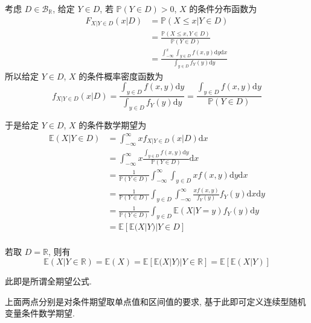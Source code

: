 \documentclass[openany]{ctexbook}
\theoremstyle{kaiti}
\theoremstyle{normal}
\begin{document}
考虑 $D\in\mathcal{B}_{\mathbb{R}}$, 给定 $Y\in D$, 若 $\mathbb{P}(Y\in D)>0$, $X$ 的条件分布函数为
\begin{equation}
  \begin{aligned}
    F_{X|Y\in D}(x|D)
    &=\mathbb{P}(X\leqslant x|Y\in D)\\
    &=\frac{\mathbb{P}(X\leqslant x,Y\in D)}{\mathbb{P}(Y\in D)}\\
    &=\frac{\displaystyle\int_{-\infty}^x\int_{y\in D}f(x,y)\mathrm{d}y\mathrm{d}x}{\displaystyle\int_{y\in D}f_Y(y)\mathrm{d}y}
  \end{aligned}
\end{equation}
所以给定 $Y\in D$, $X$ 的条件概率密度函数为
\begin{equation}
  f_{X|Y\in D}(x|D)=\frac{\displaystyle\int_{y\in D}f(x,y)\mathrm{d}y}{\displaystyle\int_{y\in D}f_Y(y)\mathrm{d}y}=\frac{\displaystyle\int_{y\in D}f(x,y)\mathrm{d}y}{\mathbb{P}(Y\in D)}
\end{equation}

于是给定 $Y\in D$, $X$ 的条件数学期望为
\begin{equation}
  \begin{aligned}
    \mathbb{E}(X|Y\in D)
    &=\int_{-\infty}^\infty xf_{X|Y\in D}(x|D)\mathrm{d}x\\
    &=\int_{-\infty}^\infty x\frac{\displaystyle\int_{y\in D}f(x,y)\mathrm{d}y}{\mathbb{P}(Y\in D)}\mathrm{d}x\\
    &=\frac{1}{\mathbb{P}(Y\in D)}\int_{-\infty}^\infty\int_{y\in D}xf(x,y)\mathrm{d}y\mathrm{d}x\\
    &=\frac{1}{\mathbb{P}(Y\in D)}\int_{y\in D}\int_{-\infty}^\infty\frac{xf(x,y)}{f_Y(y)}f_Y(y)\mathrm{d}x\mathrm{d}y\\
    &=\frac{1}{\mathbb{P}(Y\in D)}\int_{y\in D}\mathbb{E}(X|Y=y)f_Y(y)\mathrm{d}y\\
    &=\mathbb{E}[\mathbb{E}(X|Y)|Y\in D]\\
  \end{aligned}
\end{equation}

若取 $D=\mathbb{R}$, 则有
\begin{equation}
  \mathbb{E}(X|Y\in\mathbb{R})=\mathbb{E}(X)=\mathbb{E}[\mathbb{E}(X|Y)|Y\in \mathbb{R}]=\mathbb{E}[\mathbb{E}(X|Y)]
\end{equation}

此即是所谓全期望公式.

上面两点分别是对条件期望取单点值和区间值的要求, 基于此即可定义连续型随机变量条件数学期望.
\end{document}
